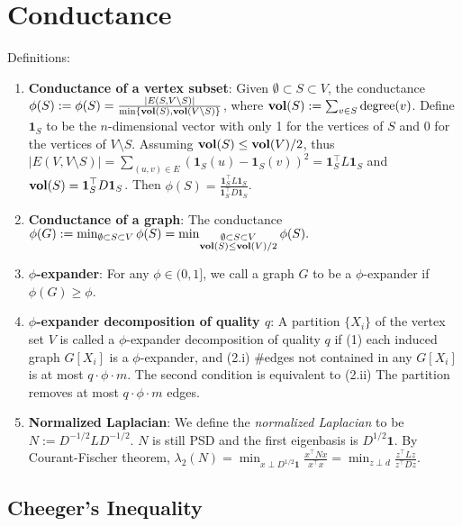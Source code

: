 \section{Conductance}

Definitions:
\begin{enumerate}
    \item \textbf{Conductance of a vertex subset}: Given $\emptyset \subset S \subset V$, the conductance $\phi(S) := \phi(S)=\frac{|E(S, V \backslash S)|}{\min \{\operatorname{\textbf{vol}}(S), \operatorname{\textbf{vol}}(V \backslash S)\}}$, where $\operatorname{\textbf{vol}}(S) := \sum_{v \in S} \text{degree}(v)$. Define $\boldsymbol{1}_S$ to be the $n$-dimensional vector with only 1 for the vertices of $S$ and 0 for the vertices of $V \setminus S$. Assuming $\operatorname{\textbf{vol}}(S) \le \operatorname{\textbf{vol}}(V)/2$, thus $|E(V, V\setminus S)|= \sum_{(u,v)\in E} (\boldsymbol{1}_S(u) - \boldsymbol{1}_S(v))^2 = \boldsymbol{1}_S^\top L \boldsymbol{1}_S$ and $\operatorname{\textbf{vol}}(S) = \boldsymbol{1}_S^\top D \boldsymbol{1}_S$. Then $\phi(S) = \frac{\boldsymbol{1}_S^\top L \boldsymbol{1}_S}{\boldsymbol{1}_S^\top D \boldsymbol{1}_S}$.

    \item \textbf{Conductance of a graph}: The conductance $\phi(G) := \min_{\emptyset \subset S \subset V} \phi(S) = \min_{\substack{\emptyset \subset S \subset V \\ \operatorname{\textbf{vol}}(S)\le\operatorname{\textbf{vol}}(V)/2}} \phi(S).$

    \item \textbf{$\phi$-expander}: For any $\phi \in (0,1]$, we call a graph $G$ to be a $\phi$-expander if $\phi(G)\ge \phi$.
    \item \textbf{$\phi$-expander decomposition of quality $q$}: A partition $\{X_i\}$ of the vertex set $V$ is called a $\phi$-expander decomposition of quality $q$ if (1) each induced graph $G[X_i]$ is a $\phi$-expander, and (2.i) \#edges not contained in any $G[X_i]$ is at most $q\cdot\phi\cdot m$. The second condition is equivalent to (2.ii) The partition removes at most $q\cdot\phi\cdot m$ edges.
    \item \textbf{Normalized Laplacian}: We define the \textit{normalized Laplacian} to be $N := D^{-1/2} L D^{-1/2}$. $N$ is still PSD and the first eigenbasis is $D^{1/2}\boldsymbol{1}$. By Courant-Fischer theorem, $\lambda_2(N) = \min_{x \perp D^{1/2}\boldsymbol{1}} \frac{x^\top N x}{x^\top x} = \min_{z \perp d} \frac{z^\top L z}{z^\top D z}$.
\end{enumerate}

\subsection{Cheeger's Inequality}

